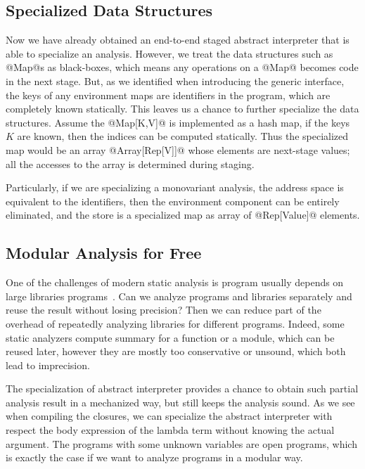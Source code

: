 \subsection{Specialized Data Structures} \label{staged_ds}

Now we have already obtained an end-to-end staged abstract interpreter that is able to 
specialize an analysis. However, we treat the data structures such as @Map@s as black-boxes,
which means any operations on a @Map@ becomes code in the next stage.
But, as we identified when introducing the generic interface, the keys of any environment maps are 
identifiers in the program, which are completely known statically. 
This leaves us a chance to further specialize the data structures. 
Assume the @Map[K,V]@ is implemented as a hash map, if the keys $K$ are known, then the indices can be computed
statically. Thus the specialized map would be an array @Array[Rep[V]]@ whose elements 
are next-stage values; all the accesses to the array is determined during staging.

Particularly, if we are specializing a monovariant analysis, the address space 
is equivalent to the identifiers, then the environment component can be entirely eliminated, 
and the store is a specialized map as array of @Rep[Value]@ elements.

\subsection{Modular Analysis for Free}

One of the challenges of modern static analysis is program usually depends on
large libraries programs~\cite{toman_et_al:LIPIcs:2017:7121}. 
Can we analyze programs and libraries separately and reuse the result without losing precision? 
Then we can reduce part of the overhead of repeatedly analyzing libraries for different programs.
Indeed, some static analyzers compute summary for a function or a module, which can be reused
later, however they are mostly too conservative or unsound, which both lead to imprecision.

The specialization of abstract interpreter provides a chance to obtain such partial analysis 
result in a mechanized way, but still keeps the analysis sound.
As we see when compiling the closures, we can specialize the abstract interpreter
with respect the body expression of the lambda term without knowing the actual argument.
The programs with some unknown variables are open programs, which is exactly the case 
if we want to analyze programs in a modular way.

